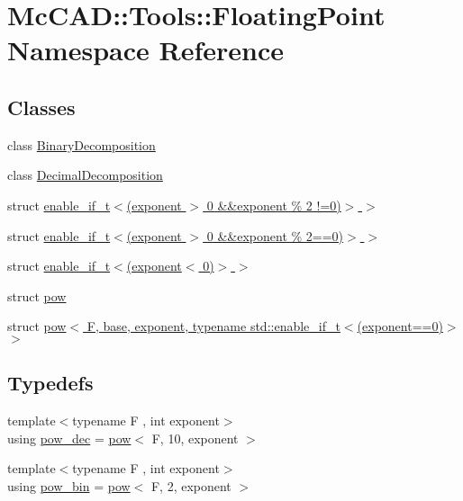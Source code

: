 \hypertarget{namespaceMcCAD_1_1Tools_1_1FloatingPoint}{}\section{Mc\+C\+AD\+:\+:Tools\+:\+:Floating\+Point Namespace Reference}
\label{namespaceMcCAD_1_1Tools_1_1FloatingPoint}
\subsection*{Classes}
\begin{DoxyCompactItemize}
\item 
class \hyperlink{classMcCAD_1_1Tools_1_1FloatingPoint_1_1BinaryDecomposition}{Binary\+Decomposition}
\item 
class \hyperlink{classMcCAD_1_1Tools_1_1FloatingPoint_1_1DecimalDecomposition}{Decimal\+Decomposition}
\item 
struct \hyperlink{structMcCAD_1_1Tools_1_1FloatingPoint_1_1pow_3_01F_00_01base_00_01exponent_00_01typename_01std_1d117ee30652e6f2d2ba43f6f7226f9bb}{enable\+\_\+if\+\_\+t$<$(exponent $>$ 0 \&\&exponent \% 2 !=0)$>$ $>$}
\item 
struct \hyperlink{structMcCAD_1_1Tools_1_1FloatingPoint_1_1pow_3_01F_00_01base_00_01exponent_00_01typename_01std_1fbe724281e4ffedd41c36bda2837c2ab}{enable\+\_\+if\+\_\+t$<$(exponent $>$ 0 \&\&exponent \% 2==0)$>$ $>$}
\item 
struct \hyperlink{structMcCAD_1_1Tools_1_1FloatingPoint_1_1pow_3_01F_00_01base_00_01exponent_00_01typename_01std_1d82a2d6b1221060811eec8f3212877c0}{enable\+\_\+if\+\_\+t$<$(exponent$<$ 0)$>$ $>$}
\item 
struct \hyperlink{structMcCAD_1_1Tools_1_1FloatingPoint_1_1pow}{pow}
\item 
struct \hyperlink{structMcCAD_1_1Tools_1_1FloatingPoint_1_1pow_3_01F_00_01base_00_01exponent_00_01typename_01std_1b3fe654468519164c12b9c498dff3673}{pow$<$ F, base, exponent, typename std\+::enable\+\_\+if\+\_\+t$<$(exponent==0)$>$ $>$}
\end{DoxyCompactItemize}
\subsection*{Typedefs}
\begin{DoxyCompactItemize}
\item 
{\footnotesize template$<$typename F , int exponent$>$ }\\using \hyperlink{namespaceMcCAD_1_1Tools_1_1FloatingPoint_a0b858b88c4f82794ed9b131334b83ade}{pow\+\_\+dec} = \hyperlink{structMcCAD_1_1Tools_1_1FloatingPoint_1_1pow}{pow}$<$ F, 10, exponent $>$
\item 
{\footnotesize template$<$typename F , int exponent$>$ }\\using \hyperlink{namespaceMcCAD_1_1Tools_1_1FloatingPoint_ad668f5149777d636ded664cb5e7e2940}{pow\+\_\+bin} = \hyperlink{structMcCAD_1_1Tools_1_1FloatingPoint_1_1pow}{pow}$<$ F, 2, exponent $>$
\end{DoxyCompactItemize}
